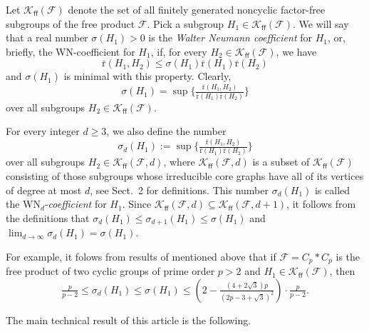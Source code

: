 \documentclass[10pt, reqno]{amsart}
\numberwithin{equation}{section}
\begin{document}
Let ${ \mathcal{K}_{\textsf{ff}}(\mathcal{F})}$  denote the set of all finitely generated noncyclic factor-free subgroups of the free product  ${\mathcal{F}}$.
Pick a subgroup $H_1 \in { \mathcal{K}_{\textsf{ff}}(\mathcal{F})}$.  We will say that a real number $\sigma(H_1) >0 $ is the {\em Walter Neumann coefficient} for   $H_1$, or,  briefly, the WN-coefficient for $H_1$,   if, for every  $H_2 \in { \mathcal{K}_{\textsf{ff}}(\mathcal{F})}$, we have
\begin{equation}\label{dfy0}
{\bar {\mathrm{r}}} (H_1 , H_2) \le \sigma(H_1)  {\bar {\mathrm{r}}}(H_1) {\bar {\mathrm{r}}}(H_2)
\end{equation}
and  $\sigma(H_1)$ is minimal  with this property. Clearly,
$$
\sigma(H_1)  = \sup \{ \tfrac{{\bar {\mathrm{r}}} (H_1,  H_2)}{{\bar {\mathrm{r}}} (H_1) {\bar {\mathrm{r}}} (H_2) } \}
$$ over all  subgroups $H_2 \in { \mathcal{K}_{\textsf{ff}}(\mathcal{F})}$.

For every integer $d \ge 3$, we also define the number
\begin{equation}\label{dfy0d}
\sigma_d(H_1)  := \sup \{ \tfrac{{\bar {\mathrm{r}}} (H_1 ,  H_2)}{{\bar {\mathrm{r}}} (H_1) {\bar {\mathrm{r}}} (H_2) } \}
\end{equation}
over all  subgroups $H_2 \in { \mathcal{K}_{\textsf{ff}}(\mathcal{F}, d)}$, where ${ \mathcal{K}_{\textsf{ff}}(\mathcal{F}, d)}$ is a subset of $ { \mathcal{K}_{\textsf{ff}}(\mathcal{F})} $ consisting of those subgroups
whose  irreducible core graphs have all of its vertices of degree at most $d$, see Sect.~2 for definitions.
This number  $\sigma_d(H_1)$ is called the  WN${}_d$-{\em coefficient} for    $H_1$.
 Since  ${ \mathcal{K}_{\textsf{ff}}(\mathcal{F}, d)} \subseteq \mathcal K_{\textsf{ff}}({\mathcal{F}}, d+1)$, it follows from the definitions that  $\sigma_d(H_1) \le \sigma_{d+1}(H_1) \le \sigma(H_1)$ and $\lim_{d \to \infty} \sigma_d(H_1) = \sigma(H_1)$.

For example, it folows from results of   \cite{DIv, DIv2} mentioned above  that if  ${\mathcal{F}} = C_p * C_p$ is the
free product of two cyclic groups of  prime order $p >2$ and  $H_1 \in { \mathcal{K}_{\textsf{ff}}(\mathcal{F})}$, then
$$
\tfrac{p}{p-2} \le   \sigma_d(H_1)\le \sigma(H_1)  \le   \left(2 - \tfrac{(4+2\sqrt{3})p}{(2p-3+\sqrt{3})^2} \right) \cdot \tfrac{p}{p-2} .
$$

The main technical result of this article is the following.
\end{document}
